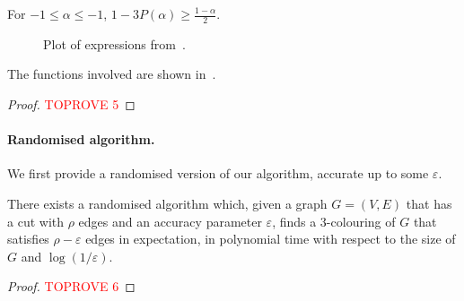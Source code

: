 \documentclass[a4paper,11pt, DIV=11]{scrartcl}
\renewcommand{\epsilon}{\varepsilon}
\theoremstyle{plain}
\theoremstyle{definition}
\begin{document}
\begin{lemma}\label{lem:ineq}
    For $-1 \leq \alpha \leq -1$, $1 - 3P(\alpha) \geq \frac{1 - \alpha}{2}$.
\end{lemma}
\begin{figure}
\begin{center}
\end{center}
\caption{Plot of expressions from~.}\label{fig:plots}
\end{figure}
The functions involved are shown in~.
\begin{proof}\textcolor{red}{TOPROVE 5}\end{proof}

\paragraph{Randomised algorithm.} We first provide a randomised version of our algorithm, accurate up to some $\epsilon$.

\begin{theorem}
    There exists a randomised algorithm which, given a graph $G = (V, E)$ that has a cut with $\rho$ edges and an accuracy parameter $\epsilon$, finds a 3-colouring of $G$ that satisfies $\rho-\epsilon$ edges in expectation, in polynomial time with respect to the size of $G$ and $\log(1 / \epsilon)$.
\end{theorem}

\begin{proof}\textcolor{red}{TOPROVE 6}\end{proof}
\end{document}
